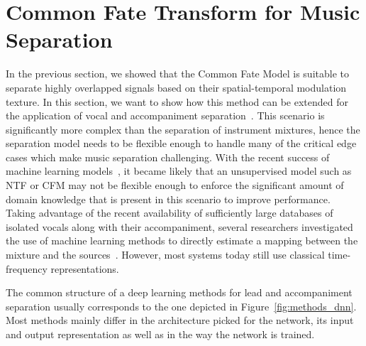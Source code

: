 \section{Common Fate Transform for Music Separation}%
\label{sec:cft_for_lead_accompaniment_separation}


In the previous section, we showed that the Common Fate Model is suitable to separate highly overlapped signals based on their spatial-temporal modulation texture.
In this section, we want to show how this method can be extended for the application of vocal and accompaniment separation~\cite{rafii}.
This scenario is significantly more complex than the separation of instrument mixtures, hence the separation model needs to be flexible enough to handle many of the critical edge cases which make music separation challenging.
With the recent success of machine learning models~\cite{HintonSpeech}, it became likely that an unsupervised model such as NTF or CFM may not be flexible enough to enforce the significant amount of domain knowledge that is present in this scenario to improve performance.
Taking advantage of the recent availability of sufficiently large databases of isolated vocals along with their accompaniment, several researchers investigated the use of machine learning methods to directly estimate a mapping between the mixture and the sources~\cite{huang14, uhlich15}.
However, most systems today still use classical time-frequency representations.
\par
The common structure of a deep learning methods for lead and accompaniment separation usually corresponds to the one depicted in Figure~\ref{fig:methods_dnn}.
Most methods mainly differ in the architecture picked for the network, its input and output representation as well as in the way the network is trained.

